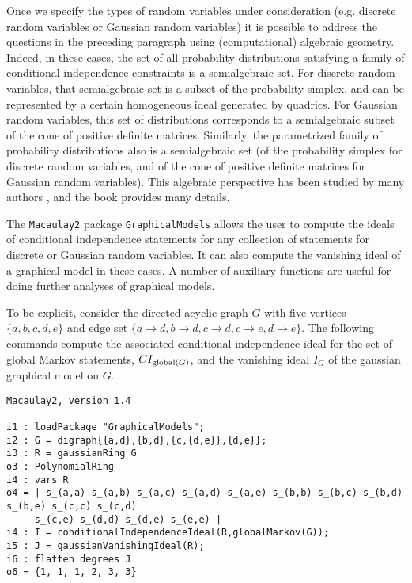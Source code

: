 \documentclass[letterpaper]{article}
\theoremstyle{definition}
\begin{document}
Once we specify the types of random variables under consideration
(e.g. discrete random variables or Gaussian random variables) it
is possible to address the questions in the preceding paragraph
using (computational) algebraic geometry.  Indeed, in these cases,
the set of all probability distributions satisfying a family of 
conditional independence constraints is a semialgebraic set.
For discrete random variables, that semialgebraic set is a subset
of the probability simplex, and can be represented by a certain
homogeneous ideal generated by quadrics.  For Gaussian random variables,
this set of distributions corresponds to a semialgebraic subset
of the cone of positive definite matrices.  Similarly,
the parametrized family of probability distributions also
is a semialgebraic set (of the probability simplex for discrete
random variables, and of the cone of positive definite matrices
for Gaussian random variables).  This algebraic perspective
has been studied by many authors %
\cite{DS, GSS, GMS, S}, and the book \cite{DSS}
provides many details.

The {\tt Macaulay2} package {\tt GraphicalModels} allows the user to compute
the ideals of conditional independence statements for any collection
of statements for discrete or Gaussian
random variables.  It can also compute the vanishing ideal of 
a graphical model in these cases.  A number of auxiliary functions
are useful for doing further analyses of graphical models.

To be explicit, consider the directed acyclic graph $G$ with  five
vertices $\{a,b,c,d,e\}$ and edge
set $\{a \to d, b \to d, c \to d, c \to e, d \to e\}$.
The following commands compute the associated conditional
independence ideal for the set of global Markov statements,
$CI_{{\rm global}(G)}$, and 
the vanishing ideal $I_{G}$ of the gaussian graphical model on $G$.


\begin{verbatim}
Macaulay2, version 1.4

i1 : loadPackage "GraphicalModels";
i2 : G = digraph{{a,d},{b,d},{c,{d,e}},{d,e}}; 
i3 : R = gaussianRing G
o3 : PolynomialRing
i4 : vars R
o4 = | s_(a,a) s_(a,b) s_(a,c) s_(a,d) s_(a,e) s_(b,b) s_(b,c) s_(b,d) s_(b,e) s_(c,c) s_(c,d)
     s_(c,e) s_(d,d) s_(d,e) s_(e,e) |
i4 : I = conditionalIndependenceIdeal(R,globalMarkov(G));
i5 : J = gaussianVanishingIdeal(R);
i6 : flatten degrees J
o6 = {1, 1, 1, 2, 3, 3}
\end{verbatim}
\end{document}
